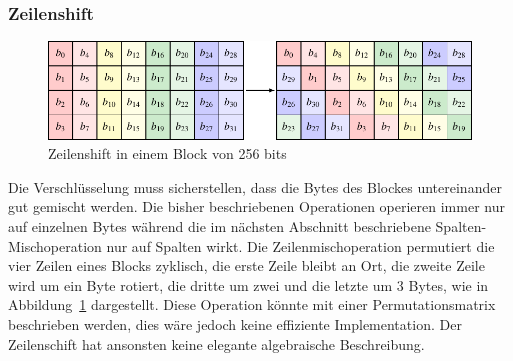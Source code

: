 \subsubsection{Zeilenshift}
\begin{figure}
\centering
\includegraphics[width=\textwidth]{chapters/90-crypto/images/shift.pdf}
\caption{Zeilenshift in einem Block von 256 bits
\label{buch:crypto:fig:shift}}
\end{figure}
Die Verschlüsselung muss sicherstellen, dass die Bytes des Blockes
untereinander gut gemischt werden.
Die bisher beschriebenen Operationen operieren immer nur auf einzelnen
Bytes während
die im nächsten Abschnitt beschriebene Spalten-Mischoperation
nur auf Spalten wirkt.
Die Zeilen\-misch\-ope\-ra\-tion permutiert die vier Zeilen
eines Blocks zyklisch, die erste Zeile bleibt an Ort, die zweite
Zeile wird um ein Byte rotiert, die dritte um zwei und die letzte
um 3 Bytes, wie in Abbildung~\ref{buch:crypto:fig:shift}
dargestellt.
Diese Operation könnte mit einer Permutationsmatrix beschrieben werden,
dies wäre jedoch keine effiziente Implementation.
Der Zeilenschift hat ansonsten keine elegante algebraische Beschreibung.

